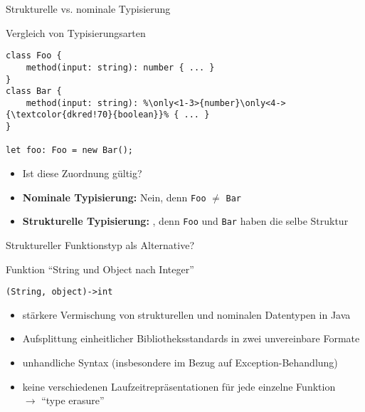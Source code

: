 \begin{frame}[fragile]{Strukturelle vs. nominale Typisierung}
    
    \centering
    \begin{minipage}[b]{0.75\textwidth}
        \begin{block}{Vergleich von Typisierungsarten \citep{kyle16}}
            \begin{lstlisting}
class Foo {
    method(input: string): number { ... }
}
class Bar {
    method(input: string): %\only<1-3>{number}\only<4->{\textcolor{dkred!70}{boolean}}% { ... }
}

let foo: Foo = new Bar();
            \end{lstlisting}
        \end{block}
    \end{minipage}
    
    \linespread{1.6}

    \begin{itemize}
        \item<1-> Ist diese Zuordnung gültig?
        \item<2-> \textbf{Nominale Typisierung:} Nein, denn \texttt{Foo} $\neq$ \texttt{Bar}
        \item<3-> \textbf{Strukturelle Typisierung:} , 
        denn \texttt{Foo} und \texttt{Bar} haben die selbe Struktur
    \end{itemize}
\end{frame}


\begin{frame}[fragile]{Struktureller Funktionstyp als Alternative?}

    \centering
    \begin{minipage}[b]{0.75\textwidth}
        \begin{block}{Funktion \enquote{String und Object nach Integer} \citep{goetz13}}
            \begin{lstlisting}
(String, object)->int
            \end{lstlisting}
        \end{block}
    \end{minipage}

    \begin{itemize}
        \item<2-> stärkere Vermischung von strukturellen und nominalen Datentypen in Java
        \item<3-> Aufsplittung einheitlicher Bibliotheksstandards in zwei unvereinbare Formate 
        \item<4-> unhandliche Syntax (insbesondere im Bezug auf Exception-Behandlung)
        \item<5-> keine verschiedenen Laufzeitrepräsentationen für jede einzelne Funktion 
        \\$\rightarrow$ \enquote{type erasure}
    \end{itemize}
\end{frame}
